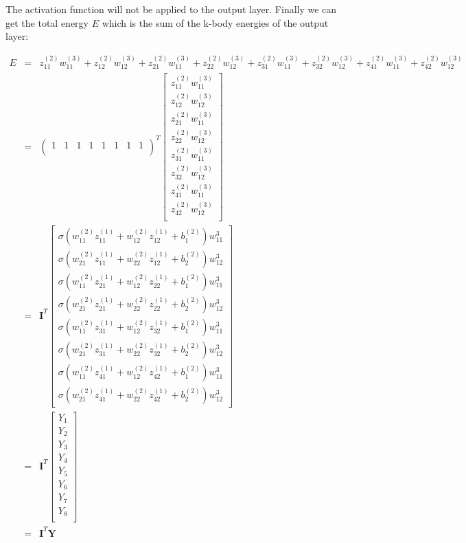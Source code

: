 \documentclass{article}
\begin{document}
\noindent The activation function will not be applied to the output layer.
Finally we can get the total energy $E$ which is the sum of the k-body energies of 
the output layer:

\begin{eqnarray}
E 
& = & 
z^{(2)}_{11}w^{(3)}_{11} + z^{(2)}_{12}w^{(3)}_{12} + 
z^{(2)}_{21}w^{(3)}_{11} + z^{(2)}_{22}w^{(3)}_{12} + 
z^{(2)}_{31}w^{(3)}_{11} + z^{(2)}_{32}w^{(3)}_{12} + 
z^{(2)}_{41}w^{(3)}_{11} + z^{(2)}_{42}w^{(3)}_{12} \nonumber \\
& = &
\left(\begin{array}{cccccccc}
	1 & 1 & 1 & 1 & 1 & 1 & 1 & 1 \\
\end{array}
\right)^T
\left[\begin{array}{c}
	z^{(2)}_{11}w^{(3)}_{11} \\
	z^{(2)}_{12}w^{(3)}_{12} \\
	z^{(2)}_{21}w^{(3)}_{11} \\
	z^{(2)}_{22}w^{(3)}_{12} \\
	z^{(2)}_{31}w^{(3)}_{11} \\
	z^{(2)}_{32}w^{(3)}_{12} \\
	z^{(2)}_{41}w^{(3)}_{11} \\
	z^{(2)}_{42}w^{(3)}_{12} \\
\end{array}
\right] \nonumber \\
& = &
\mathbf{I}^T
\left[\begin{array}{c}
	\sigma(w^{(2)}_{11}z^{(1)}_{11} + w^{(2)}_{12}z^{(1)}_{12} + b^{(2)}_1)w^3_{11} \\
	\sigma(w^{(2)}_{21}z^{(1)}_{11} + w^{(2)}_{22}z^{(1)}_{12} + b^{(2)}_2)w^3_{12} \\
	\sigma(w^{(2)}_{11}z^{(1)}_{21} + w^{(2)}_{12}z^{(1)}_{22} + b^{(2)}_1)w^3_{11} \\ 
	\sigma(w^{(2)}_{21}z^{(1)}_{21} + w^{(2)}_{22}z^{(1)}_{22} + b^{(2)}_2)w^3_{12} \\
	\sigma(w^{(2)}_{11}z^{(1)}_{31} + w^{(2)}_{12}z^{(1)}_{32} + b^{(2)}_1)w^3_{11} \\
	\sigma(w^{(2)}_{21}z^{(1)}_{31} + w^{(2)}_{22}z^{(1)}_{32} + b^{(2)}_2)w^3_{12} \\
	\sigma(w^{(2)}_{11}z^{(1)}_{41} + w^{(2)}_{12}z^{(1)}_{42} + b^{(2)}_1)w^3_{11} \\
	\sigma(w^{(2)}_{21}z^{(1)}_{41} + w^{(2)}_{22}z^{(1)}_{42} + b^{(2)}_2)w^3_{12}
\end{array}
\right] \nonumber \\ 
& = & 
\mathbf{I}^T \left[\begin{array}{c}
	Y_{1} \\
	Y_{2} \\
	Y_{3} \\
	Y_{4} \\
	Y_{5} \\
	Y_{6} \\
	Y_{7} \\
	Y_{8} \\
\end{array}
\right] \nonumber \\
& = & 
\mathbf{I}^T \mathbf{Y}
\end{eqnarray}
\end{document}
